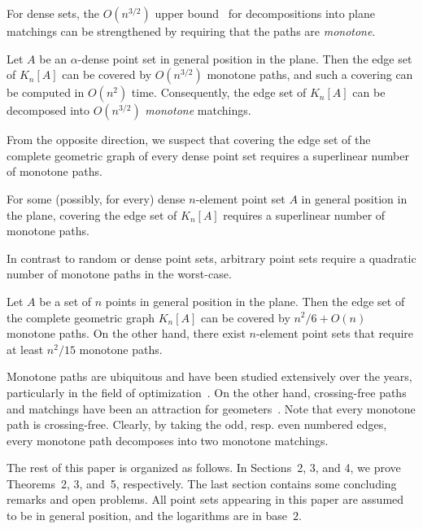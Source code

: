 \documentclass[a4paper,USenglish]{lipics-v2021}
\begin{document}
For dense sets, the $O(n^{3/2})$ upper bound~\cite{ADH+05} for decompositions into
plane matchings can be strengthened by requiring that the paths are \emph{monotone}.

\begin{theorem}\label{thm:dense}
  Let $A$ be an $\alpha$-dense point set in general position in the plane. 
  Then the edge set of $K_n[A]$ can be covered by $O(n^{3/2})$ {monotone} paths, 
  and such a covering can be computed in $O(n^2)$ time.
  Consequently, the edge set of $K_n[A]$ can be decomposed into $O(n^{3/2})$ \emph{monotone} matchings. 
\end{theorem}

From the opposite direction, we suspect that covering the edge set of the complete geometric graph
of every dense point set requires a superlinear number of monotone paths.

\begin{conjecture}\label{conj:dense-lb}
  For some (possibly, for every) dense $n$-element point set $A$ in general position in the plane,
  covering the edge set of $K_n[A]$ requires a superlinear number of monotone paths.
\end{conjecture}

In contrast to random or dense point sets, arbitrary point sets require a quadratic number
of monotone paths in the worst-case.

\begin{theorem}\label{thm:arbitrary}
  Let $A$ be a set of $n$ points in general position in the plane.
  Then the edge set of the complete geometric graph $K_n[A]$ can be covered by $n^2/6 + O(n)$ monotone paths. 
  On the other hand, there exist $n$-element point sets that require at least $n^2/15$ monotone paths.
\end{theorem}


Monotone paths are ubiquitous and have been studied extensively over the years,
particularly in the field of optimization~\cite{DRT13}. On the other hand,
crossing-free paths and matchings have been an attraction for geometers~\cite{KPT97,KPTV98,KLN91}.
Note that every monotone path is crossing-free. Clearly, by taking the odd, resp. even numbered edges, every monotone path decomposes into two monotone matchings. 

The rest of this paper is organized as follows. In Sections~2, 3, and 4, we prove Theorems~2, 3, and~5,
respectively. The last section contains some concluding remarks and open problems.  
All point sets appearing in this paper are assumed to be in general position, and the logarithms are in base~$2$.
\end{document}
